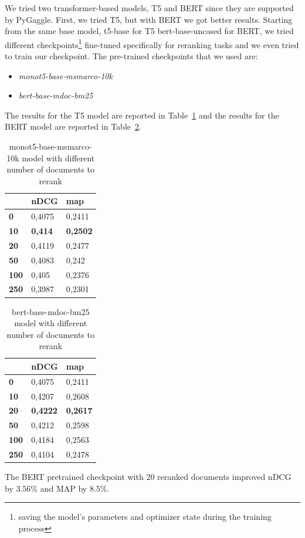 We tried two transformer-based models, T5 and BERT since they are supported by PyGaggle. First, we tried T5\cite{RaffelShazeerRobertsLeeNarangMatenaZhouLiLiuT5}, but with BERT\cite{devlin2019bert} we got better results. Starting from the same base model, t5-base\cite{t5base} for T5 bert-base-uncased\cite{bertbase} for BERT, we tried different checkpoints\footnote{saving the model's parameters and optimizer state during the training process} fine-tuned specifically for reranking tasks and we even tried to train our checkpoint. The pre-trained checkpoints that we used are: 
\begin{itemize}
\item \textit{monot5-base-msmarco-10k}\cite{castorinimonot5}
\item \textit{bert-base-mdoc-bm25}\cite{bertbasebm25}
\end{itemize}
The results for the T5 model are reported in Table~\ref{tab:t5-msmarco} and the results for the BERT model are reported in Table~\ref{tab:bert-mdoc}.
\begin{table}[!h]
\caption{\label{tab:t5-msmarco} monot5-base-msmarco-10k model with different number of documents to rerank}
\begin{tabular}{|l|l|l|}
\toprule
             & \textbf{nDCG} & \textbf{map} \\ 
\midrule
\textbf{0}   & 0,4075        & 0,2411       \\ 
\textbf{10}  & \textbf{0,414}         & \textbf{0,2502}       \\ 
\textbf{20}  & 0,4119        & 0,2477       \\ 
\textbf{50}  & 0,4083        & 0,242        \\ 
\textbf{100} & 0,405         & 0,2376       \\ 
\textbf{250} & 0,3987        & 0,2301\\
\bottomrule
\end{tabular}
\end{table}

\begin{table}[!h]
\caption{\label{tab:bert-mdoc}bert-base-mdoc-bm25 model with different number of documents to rerank}
\begin{tabular}{|l|l|l|}
\toprule
             & \textbf{nDCG} & \textbf{map} \\ 
\midrule
\textbf{0}   & 0,4075        & 0,2411       \\ 
\textbf{10}  & 0,4207         & 0,2608       \\ 
\textbf{20}  & \textbf{0,4222}        & \textbf{0,2617}       \\ 
\textbf{50}  & 0,4212        & 0,2598        \\ 
\textbf{100} & 0,4184         & 0,2563       \\ 
\textbf{250} & 0,4104        & 0,2478      \\
\bottomrule
\end{tabular}
\end{table}
The BERT pretrained checkpoint with 20 reranked documents improved \ac{nDCG} by $3.56\%$ and \ac{MAP} by $8.5\%$.\\

